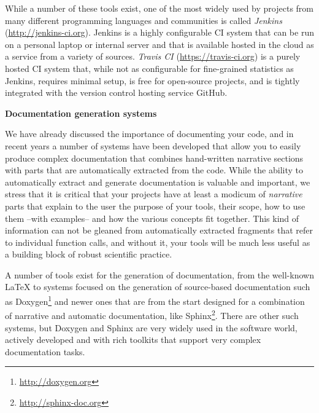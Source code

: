 \documentclass[ChapterTOCs,krantz2]{krantz} %
\newcommand{\blockpar}[1]{\vspace*{3mm} \noindent \textbf{#1}}
\begin{document}
While a number of these tools exist, one of the most widely used by projects
from many different programming languages and communities is called
\emph{Jenkins} (\url{http://jenkins-ci.org}).  Jenkins is a highly configurable
CI system that can be run on a personal laptop or internal server and that is
available hosted in the cloud as a service from a variety of sources.
\emph{Travis CI} (\url{https://travis-ci.org}) is a purely hosted CI system
that, while not as configurable for fine-grained statistics as Jenkins,
requires minimal setup, is free for open-source projects, and is tightly
integrated with the version control hosting service GitHub.

\blockpar{Documentation generation systems}

We have already discussed the importance of documenting your code, and in
recent years a number of systems have been developed that allow you to easily
produce complex documentation that combines hand-written narrative sections
with parts that are automatically extracted from the code.  While the ability
to automatically extract and generate documentation is valuable and important,
we stress that it is critical that your projects have at least a modicum of
\emph{narrative} parts that explain to the user the purpose of your tools,
their scope, how to use them --with examples-- and how the various concepts fit
together.  This kind of information can not be gleaned from automatically
extracted fragments that refer to individual function calls, and without it,
your tools will be much less useful as a building block of robust scientific
practice.

A number of tools exist for the generation of documentation, from the
well-known \LaTeX{} to systems focused on the generation of source-based
documentation such as Doxygen\footnote{\url{http://doxygen.org}} and newer ones
that are from the start designed for a combination of narrative and automatic
documentation, like Sphinx\footnote{\url{http://sphinx-doc.org}}.  There are
other such systems, but Doxygen and Sphinx are very widely used in the software
world, actively developed and with rich toolkits that support very complex
documentation tasks.
\end{document}
